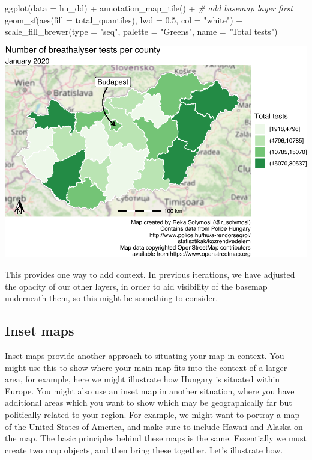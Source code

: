 \documentclass[
  krantz2]{krantz}
\makeatletter
\newenvironment{Shaded}{\begin{snugshade}}{\end{snugshade}}
\newcommand{\AttributeTok}[1]{\textcolor[rgb]{0.61,0.61,0.61}{#1}}
\newcommand{\CommentTok}[1]{\textcolor[rgb]{0.37,0.37,0.37}{\textit{#1}}}
\newcommand{\FloatTok}[1]{\textcolor[rgb]{0.06,0.06,0.06}{#1}}
\newcommand{\FunctionTok}[1]{\textcolor[rgb]{0,0,0}{#1}}
\newcommand{\NormalTok}[1]{#1}
\newcommand{\SpecialCharTok}[1]{\textcolor[rgb]{0,0,0}{#1}}
\newcommand{\StringTok}[1]{\textcolor[rgb]{0.5,0.5,0.5}{#1}}
\newenvironment{kframe}{%
\medskip{}
\setlength{\fboxsep}{.8em}
 \def\at@end@of@kframe{}%
 \ifinner\ifhmode%
  \def\at@end@of@kframe{\end{minipage}}%
  \begin{minipage}{\columnwidth}%
 \fi\fi%
 \def\FrameCommand##1{\hskip\@totalleftmargin \hskip-\fboxsep
 \colorbox{shadecolor}{##1}\hskip-\fboxsep
     \hskip-\linewidth \hskip-\@totalleftmargin \hskip\columnwidth}%
 \MakeFramed {\advance\hsize-\width
   \@totalleftmargin\z@ \linewidth\hsize
   \@setminipage}}%
 {\par\unskip\endMakeFramed%
 \at@end@of@kframe}
\renewenvironment{Shaded}{\begin{kframe}}{\end{kframe}}
\makeatother
\begin{document}
\begin{Shaded}
\begin{Highlighting}[]
\FunctionTok{ggplot}\NormalTok{(}\AttributeTok{data =}\NormalTok{ hu\_dd) }\SpecialCharTok{+} 
  \FunctionTok{annotation\_map\_tile}\NormalTok{() }\SpecialCharTok{+}  \CommentTok{\# add basemap layer first}
  \FunctionTok{geom\_sf}\NormalTok{(}\FunctionTok{aes}\NormalTok{(}\AttributeTok{fill =}\NormalTok{ total\_quantiles), }
          \AttributeTok{lwd =} \FloatTok{0.5}\NormalTok{, }\AttributeTok{col =} \StringTok{"white"}\NormalTok{) }\SpecialCharTok{+} 
  \FunctionTok{scale\_fill\_brewer}\NormalTok{(}\AttributeTok{type =} \StringTok{"seq"}\NormalTok{, }
                    \AttributeTok{palette =} \StringTok{"Greens"}\NormalTok{, }
                    \AttributeTok{name =} \StringTok{"Total tests"}\NormalTok{) }
\end{Highlighting}
\end{Shaded}

\includegraphics{crime_mapping_files/figure-latex/basemap-1.pdf}

This provides one way to add context. In previous iterations, we have adjusted the opacity of our other layers, in order to aid visibility of the basemap underneath them, so this might be something to consider.

\hypertarget{inset-maps}{%
\subsection{Inset maps}\label{inset-maps}}

Inset maps provide another approach to situating your map in context. You might use this to show where your main map fits into the context of a larger area, for example, here we might illustrate how Hungary is situated within Europe. You might also use an inset map in another situation, where you have additional areas which you want to show which may be geographically far but politically related to your region. For example, we might want to portray a map of the United States of America, and make sure to include Hawaii and Alaska on the map. The basic principles behind these maps is the same. Essentially we must create two map objects, and then bring these together. Let's illustrate how.
\end{document}
